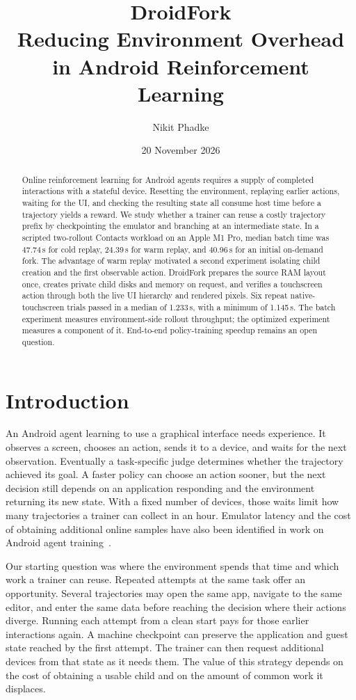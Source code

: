 \documentclass[11pt,letterpaper]{article}
\title{\vspace{-1.4em}\textbf{DroidFork}\\[3pt]
\large Reducing Environment Overhead in Android Reinforcement Learning}
\author{Nikit Phadke}
\date{20 November 2026}
\begin{document}
\maketitle
\begin{abstract}
Online reinforcement learning for Android agents requires a supply of completed interactions with a stateful device. Resetting the environment, replaying earlier actions, waiting for the UI, and checking the resulting state all consume host time before a trajectory yields a reward. We study whether a trainer can reuse a costly trajectory prefix by checkpointing the emulator and branching at an intermediate state. In a scripted two-rollout Contacts workload on an Apple M1 Pro, median batch time was 47.74\,s for cold replay, 24.39\,s for warm replay, and 40.96\,s for an initial on-demand fork. The advantage of warm replay motivated a second experiment isolating child creation and the first observable action. DroidFork prepares the source RAM layout once, creates private child disks and memory on request, and verifies a touchscreen action through both the live UI hierarchy and rendered pixels. Six repeat native-touchscreen trials passed in a median of 1.233\,s, with a minimum of 1.145\,s. The batch experiment measures environment-side rollout throughput; the optimized experiment measures a component of it. End-to-end policy-training speedup remains an open question.
\end{abstract}

\section{Introduction}
An Android agent learning to use a graphical interface needs experience. It observes a screen, chooses an action, sends it to a device, and waits for the next observation. Eventually a task-specific judge determines whether the trajectory achieved its goal. A faster policy can choose an action sooner, but the next decision still depends on an application responding and the environment returning its new state. With a fixed number of devices, those waits limit how many trajectories a trainer can collect in an hour. Emulator latency and the cost of obtaining additional online samples have also been identified in work on Android agent training~\cite{coach}.

Our starting question was where the environment spends that time and which work a trainer can reuse. Repeated attempts at the same task offer an opportunity. Several trajectories may open the same app, navigate to the same editor, and enter the same data before reaching the decision where their actions diverge. Running each attempt from a clean start pays for those earlier interactions again. A machine checkpoint can preserve the application and guest state reached by the first attempt. The trainer can then request additional devices from that state as it needs them. The value of this strategy depends on the cost of obtaining a usable child and on the amount of common work it displaces.
\end{document}
